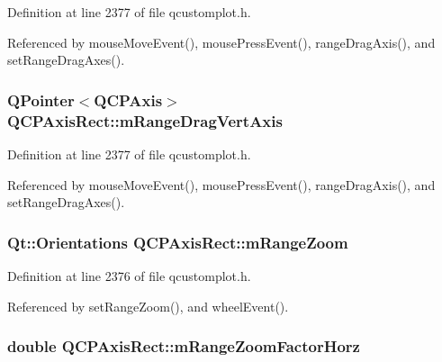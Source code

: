 Definition at line 2377 of file qcustomplot.\+h.



Referenced by mouse\+Move\+Event(), mouse\+Press\+Event(), range\+Drag\+Axis(), and set\+Range\+Drag\+Axes().

\hypertarget{class_q_c_p_axis_rect_a3e41dffec18987366f2a8ffd80689c12}{}
\subsubsection[{m\+Range\+Drag\+Vert\+Axis}]{\setlength{\rightskip}{0pt plus 5cm}Q\+Pointer$<${\bf Q\+C\+P\+Axis}$>$ Q\+C\+P\+Axis\+Rect\+::m\+Range\+Drag\+Vert\+Axis\hspace{0.3cm}{\ttfamily [protected]}}\label{class_q_c_p_axis_rect_a3e41dffec18987366f2a8ffd80689c12}


Definition at line 2377 of file qcustomplot.\+h.



Referenced by mouse\+Move\+Event(), mouse\+Press\+Event(), range\+Drag\+Axis(), and set\+Range\+Drag\+Axes().

\hypertarget{class_q_c_p_axis_rect_a215eff671d48df2edccc36e7f976f28c}{}
\subsubsection[{m\+Range\+Zoom}]{\setlength{\rightskip}{0pt plus 5cm}Qt\+::\+Orientations Q\+C\+P\+Axis\+Rect\+::m\+Range\+Zoom\hspace{0.3cm}{\ttfamily [protected]}}\label{class_q_c_p_axis_rect_a215eff671d48df2edccc36e7f976f28c}


Definition at line 2376 of file qcustomplot.\+h.



Referenced by set\+Range\+Zoom(), and wheel\+Event().

\hypertarget{class_q_c_p_axis_rect_ad08d0250ed7b99de387d0ea6c7fd4dc1}{}
\subsubsection[{m\+Range\+Zoom\+Factor\+Horz}]{\setlength{\rightskip}{0pt plus 5cm}double Q\+C\+P\+Axis\+Rect\+::m\+Range\+Zoom\+Factor\+Horz\hspace{0.3cm}{\ttfamily [protected]}}\label{class_q_c_p_axis_rect_ad08d0250ed7b99de387d0ea6c7fd4dc1}


